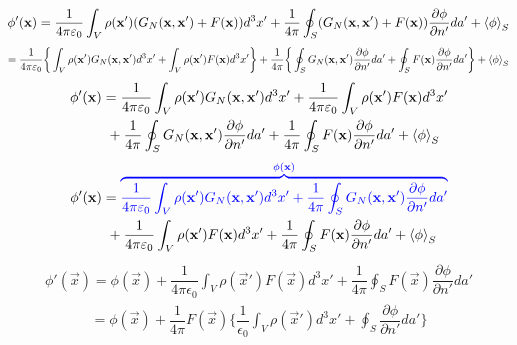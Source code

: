 \begin{align*}
\phi' ( \Vec{x}) =  \dfrac{1}{4 \pi \epsilon_{0}} \int_{V} \rho ( \vec{x}' ) ( G_{N}( \Vec{x} ,\vec{x}' ) + F(\Vec{x})) d^{3} x' + \dfrac{1}{4 \pi} \oint_{S} ( G_{N}( \Vec{x} ,\vec{x}' ) + F(\Vec{x}) ) \dfrac{\partial \phi}{\partial n'}  da' + \mean{\phi}_{S} 
\end{align*}
\begin{align*}
=  \dfrac{1}{4 \pi \epsilon_{0}} \bigg\{ \int_{V} \rho ( \vec{x}' )  G_{N}( \Vec{x} ,\vec{x}' )  d^{3} x' + \int_{V} \rho ( \vec{x}' )  F(\Vec{x})  d^{3} x' \bigg\} + \dfrac{1}{4 \pi} \bigg\{ \oint_{S} G_{N}( \Vec{x} ,\vec{x}' ) \dfrac{\partial \phi}{\partial n'} da' + \oint_{S} F(\Vec{x})  \dfrac{\partial \phi}{\partial n'}  da' \bigg\} + \mean{\phi}_{S} 
\end{align*}
\begin{align*}
\begin{aligned}
\phi' ( \Vec{x}) & =  \dfrac{1}{4 \pi \epsilon_{0}} \int_{V} \rho ( \vec{x}' )  G_{N}( \Vec{x} ,\vec{x}' )  d^{3} x' + \dfrac{1}{4 \pi \epsilon_{0}} \int_{V} \rho ( \vec{x}' )  F(\Vec{x})  d^{3} x' \\
& \ + \dfrac{1}{4 \pi} \oint_{S} G_{N}( \Vec{x} ,\vec{x}' ) \dfrac{\partial \phi}{\partial n'} da' + \dfrac{1}{4 \pi} \oint_{S} F(\Vec{x})  \dfrac{\partial \phi}{\partial n'}  da'  + \mean{\phi}_{S} 
\end{aligned}
\end{align*}
\begin{align*}
\begin{aligned}
\phi' ( \Vec{x}) & =  \begingroup \color{blue}{\overbrace{ \dfrac{1}{4 \pi \epsilon_{0}} \int_{V} \rho ( \vec{x}' )  G_{N}( \Vec{x} ,\vec{x}' )  d^{3} x' + \dfrac{1}{4 \pi} \oint_{S} G_{N}( \Vec{x} ,\vec{x}' ) \dfrac{\partial \phi}{\partial n'} da'}^\text{$\phi (\Vec{x})$}} \endgroup  \\
& \ + \dfrac{1}{4 \pi \epsilon_{0}} \int_{V} \rho ( \vec{x}' )  F(\Vec{x})  d^{3} x'  + \dfrac{1}{4 \pi} \oint_{S} F(\Vec{x})  \dfrac{\partial \phi}{\partial n'}  da'  + \mean{\phi}_{S} 
\end{aligned}
\end{align*} 
\begin{align*}
\phi' ( \Vec{x}) = \phi (\Vec{x}) + \dfrac{1}{4 \pi \epsilon_{0}} \int_{V} \rho ( \vec{x}' )  F(\Vec{x})  d^{3} x'  + \dfrac{1}{4 \pi} \oint_{S} F(\Vec{x})  \dfrac{\partial \phi}{\partial n'}  da'  
\end{align*} 
\begin{align*}
 = \phi (\Vec{x}) + \dfrac{1}{4 \pi} F(\Vec{x}) \bigg\{ \dfrac{1}{\epsilon_{0}} \int_{V} \rho ( \vec{x}' )  d^{3} x'  + \oint_{S} \dfrac{\partial \phi}{\partial n'}  da' \bigg\}  
\end{align*} 
